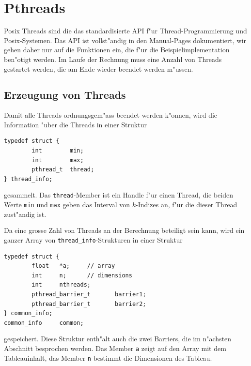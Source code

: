 \section{Pthreads}
Posix Threads sind die das standardisierte API f"ur Thread-Programmierung
und Posix-Systemen.
Das API ist vollst"andig in den Manual-Pages dokumentiert, wir gehen
daher nur auf die Funktionen ein, die f"ur die Beispielimplementation
ben"otigt werden. Im Laufe der Rechnung muss eine Anzahl von Threads
gestartet werden, die am Ende wieder beendet werden m"ussen.

\subsection{Erzeugung von Threads}
Damit alle Threads ordnungsgem"ass beendet werden k"onnen, wird die Information
"uber die Threads in einer Struktur
\begin{verbatim}
typedef struct {
        int        min;
        int        max;
        pthread_t  thread;
} thread_info;
\end{verbatim}
gesammelt. Das {\tt thread}-Member ist ein Handle f"ur einen Thread, die
beiden Werte {\tt min} und {\tt max} geben das Interval von $k$-Indizes
an, f"ur die dieser Thread zust"andig ist.

Da eine grosse Zahl von Threads an der Berechnung beteiligt sein kann,
wird ein ganzer Array von \verb+thread_info+-Strukturen in einer
Struktur
\begin{verbatim}
typedef struct {
        float   *a;     // array
        int     n;      // dimensions
        int     nthreads;
        pthread_barrier_t       barrier1;
        pthread_barrier_t       barrier2;
} common_info;
common_info     common;
\end{verbatim}
gespeichert. Diese Struktur enth"alt auch die zwei Barriers, die
im n"achsten Abschnitt besprochen werden. Das Member {\tt a}
zeigt auf den Array mit dem Tableauinhalt, das Member {\tt n} 
bestimmt die Dimensionen des Tableau.

